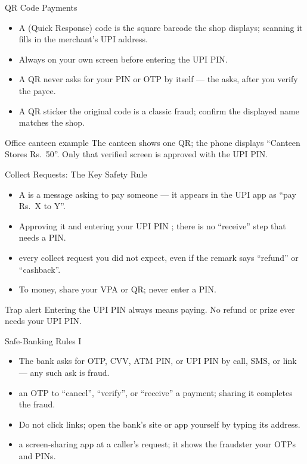 \documentclass[aspectratio=169]{beamer}
\begin{document}
\begin{frame}{QR Code Payments}
  \begin{itemize}
    \item A  (Quick Response) code is the square barcode the shop
      displays; scanning it fills in the merchant's UPI address.
    \item Always  on your own
      screen before entering the UPI PIN.
    \item A QR never asks for your PIN or OTP by itself --- the
       asks, after you verify the payee.
    \item A QR sticker  the original code is a classic
      fraud; confirm the displayed name matches the shop.
  \end{itemize}
  \begin{exampleblock}{Office canteen example}
    The canteen shows one QR; the phone displays ``Canteen Stores Rs.\ 50''.
    Only that verified screen is approved with the UPI PIN.
  \end{exampleblock}
\end{frame}

\begin{frame}{Collect Requests: The Key Safety Rule}
  \begin{itemize}
    \item A  is a message asking  to pay
      someone --- it appears in the UPI app as ``pay Rs.\ X to Y''.
    \item Approving it and entering your UPI PIN ;
      there is no ``receive'' step that needs a PIN.
    \item {} every collect request you did not expect,
      even if the remark says ``refund'' or ``cashback''.
    \item To  money, share your VPA or QR; never enter a PIN.
  \end{itemize}
  \begin{alertblock}{Trap alert}
    Entering the UPI PIN always means paying. No refund or prize ever needs
    your UPI PIN.
  \end{alertblock}
\end{frame}

\begin{frame}{Safe-Banking Rules I}
  \begin{itemize}
    \item The bank  asks for OTP, CVV, ATM PIN, or UPI PIN by
      call, SMS, or link --- any such ask is fraud.
    \item {} an OTP to ``cancel'', ``verify'', or ``receive''
      a payment; sharing it completes the fraud.
    \item Do not click  links; open the
      bank's site or app yourself by typing its address.
    \item {} a screen-sharing app at a caller's request;
      it shows the fraudster your OTPs and PINs.
  \end{itemize}
\end{frame}
\end{document}
